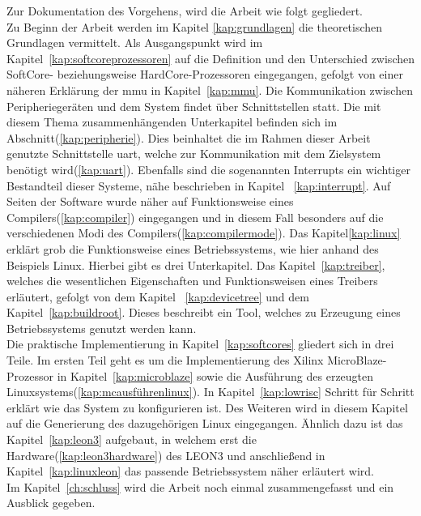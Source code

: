 Zur Dokumentation des Vorgehens, wird die Arbeit wie folgt gegliedert.\\
 Zu Beginn der Arbeit werden im Kapitel \ref{kap:grundlagen} die theoretischen Grundlagen vermittelt. Als
Ausgangspunkt wird im Kapitel~\ref{kap:softcoreprozessoren} auf die Definition und den Unterschied zwischen SoftCore- beziehungsweise HardCore-Prozessoren eingegangen,
gefolgt von einer näheren Erklärung der \ac{mmu} in Kapitel~\ref{kap:mmu}. Die Kommunikation zwischen
Peripheriegeräten und dem System findet über Schnittstellen statt. Die mit diesem Thema zusammenhängenden
Unterkapitel befinden sich im Abschnitt(\ref{kap:peripherie}).
Dies beinhaltet die im Rahmen dieser Arbeit genutzte Schnittstelle \ac{uart}, welche zur Kommunikation mit dem
Zielsystem benötigt wird(\ref{kap:uart}). Ebenfalls sind die sogenannten Interrupts ein wichtiger
Bestandteil dieser Systeme, nähe beschrieben in Kapitel ~\ref{kap:interrupt}.
Auf Seiten der Software wurde näher auf Funktionsweise eines Compilers(\ref{kap:compiler}) eingegangen und in diesem Fall
besonders auf die verschiedenen Modi des Compilers(\ref{kap:compilermode}).
Das Kapitel\ref{kap:linux} erklärt grob die
Funktionsweise eines Betriebssystems, wie hier anhand des Beispiels Linux. Hierbei gibt es drei Unterkapitel.
Das Kapitel~\ref{kap:treiber}, welches die wesentlichen Eigenschaften und Funktionsweisen
eines Treibers erläutert, gefolgt von dem Kapitel ~\ref{kap:devicetree} und dem Kapitel~\ref{kap:buildroot}.
Dieses beschreibt ein Tool, welches zu Erzeugung
eines Betriebssystems genutzt werden kann.\\
Die praktische Implementierung in Kapitel~\ref{kap:softcores} gliedert sich in drei Teile.
Im ersten Teil geht es um die Implementierung des Xilinx MicroBlaze-Prozessor in Kapitel~\ref{kap:microblaze}
sowie die Ausführung des erzeugten Linuxsystems(\ref{kap:mcausführenlinux}).
In Kapitel~\ref{kap:lowrisc} Schritt für Schritt erklärt wie das System zu konfigurieren ist. Des Weiteren wird
in diesem Kapitel auf die Generierung des dazugehörigen Linux eingegangen. Ähnlich dazu ist das Kapitel~\ref{kap:leon3} aufgebaut, in welchem
erst die Hardware(\ref{kap:leon3hardware}) des LEON3 und anschließend in Kapitel~\ref{kap:linuxleon} das passende Betriebssystem näher erläutert wird.\\
Im Kapitel~\ref{ch:schluss} wird die Arbeit noch einmal zusammengefasst und ein Ausblick gegeben.\\
